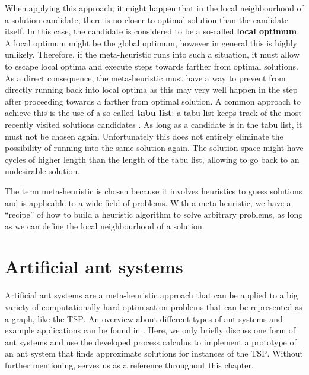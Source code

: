 When applying this approach, it might happen that in the local neighbourhood of a solution candidate, there is no closer to optimal solution than the candidate itself. In this case, the candidate is considered to be a so-called \textbf{local optimum}. A local optimum might be the global optimum, however in general this is highly unlikely. Therefore, if the meta-heuristic runs into such a situation, it must allow to escape local optima and execute steps towards farther from optimal solutions. As a direct consequence, the meta-heuristic must have a way to prevent from directly running back into local optima as this may very well happen in the step after proceeding towards a farther from optimal solution. A common approach to achieve this is the use of a so-called \textbf{tabu list}: a tabu list keeps track of the most recently visited solutions candidates \cite{Dorigo:2004:ACO:975277}. As long as a candidate is in the tabu list, it must not be chosen again. Unfortunately this does not entirely eliminate the possibility of running into the same solution again. The solution space might have cycles of higher length than the length of the tabu list, allowing to go back to an undesirable solution.

The term meta-heuristic is chosen because it involves heuristics to guess solutions and is applicable to a wide field of problems. With a meta-heuristic, we have a \enquote{recipe} of how to build a heuristic algorithm to solve arbitrary problems, as long as we can define the local neighbourhood of a solution.

\section{Artificial ant systems}
\label{chp:ant_system}
Artificial ant systems are a meta-heuristic approach that can be applied to a big variety of computationally hard optimisation problems that can be represented as a graph, like the \textsc{TSP}. An overview about different types of ant systems and example applications can be found in \cite{Dorigo:2004:ACO:975277}. Here, we only briefly discuss one form of ant systems and use the developed process calculus to implement a prototype of an ant system that finds approximate solutions for instances of the \textsc{TSP}. Without further mentioning, \cite{Dorigo:2004:ACO:975277} serves us as a reference throughout this chapter.

